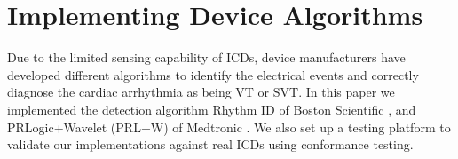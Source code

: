 \section{Implementing Device Algorithms} 
\label{sec:device models}
Due to the limited sensing capability of ICDs, device manufacturers have developed different algorithms to identify the electrical events and correctly diagnose the cardiac arrhythmia as being \ac{VT} or \ac{SVT}.
In this paper we implemented the detection algorithm Rhythm ID of Boston Scientific \cite{compass,Ellenbogen11_Pacingbook},%
and PRLogic+Wavelet (PRL+W) of Medtronic \cite{Singer,Wavelet}.
We also set up a testing platform to validate our implementations against real ICDs using conformance testing.




